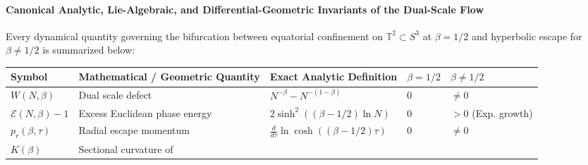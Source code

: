 \documentclass[
  11pt,
]{article}
\newcounter{none} %
\begin{document}
\paragraph{Canonical Analytic, Lie-Algebraic, and Differential-Geometric
Invariants of the Dual-Scale
Flow}\label{canonical-analytic-lie-algebraic-and-differential-geometric-invariants-of-the-dual-scale-flow}

Every dynamical quantity governing the bifurcation between equatorial
confinement on \(\mathbb{T}^2 \subset S^3\) at \(\beta = 1/2\) and
hyperbolic escape for \(\beta \neq 1/2\) is summarized below:

{\def\LTcaptype{none} %
\begin{longtable}[]{@{}
  >{\centering\arraybackslash}p{}
  >{\raggedright\arraybackslash}p{}
  >{\raggedright\arraybackslash}p{}
  >{\centering\arraybackslash}p{}
  >{\centering\arraybackslash}p{}@{}}
\toprule\noalign{}
\begin{minipage}[b]{\linewidth}\centering
Symbol
\end{minipage} & \begin{minipage}[b]{\linewidth}\raggedright
Mathematical / Geometric Quantity
\end{minipage} & \begin{minipage}[b]{\linewidth}\raggedright
Exact Analytic Definition
\end{minipage} & \begin{minipage}[b]{\linewidth}\centering
\(\beta = 1/2\)
\end{minipage} & \begin{minipage}[b]{\linewidth}\centering
\(\beta \neq 1/2\)
\end{minipage} \\
\midrule\noalign{}
\endhead
\bottomrule\noalign{}
\endlastfoot
\(W(N, \beta)\) & Dual scale defect & \(N^{-\beta} - N^{-(1-\beta)}\) &
\textbf{\(0\)} & \(\neq 0\) \\
\(\mathcal{E}(N, \beta) - 1\) & Excess Euclidean phase energy &
\(2\sinh^2((\beta - 1/2)\ln N)\) & \textbf{\(0\)} & \(> 0\) (Exp.
growth) \\
\(p_r(\beta, \tau)\) & Radial escape momentum &
\(\frac{d}{d\tau}\ln\cosh((\beta - 1/2)\tau)\) & \textbf{\(0\)} &
\(\neq 0\) \\
\(K(\beta)\) & Sectional curvature of

\end{longtable}}
\end{document}

